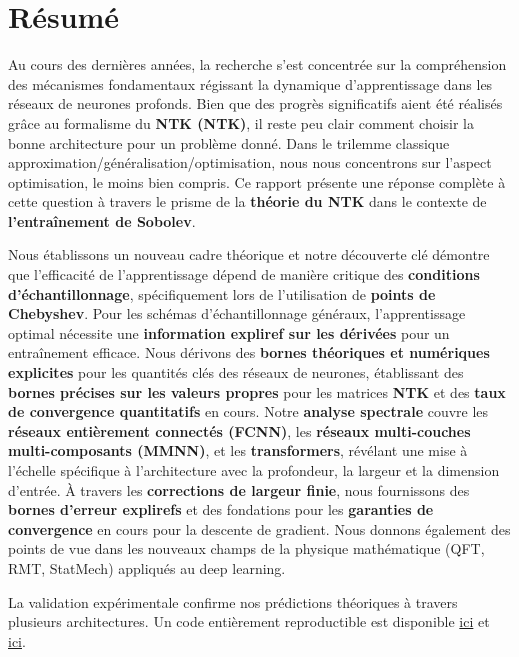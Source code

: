 \documentclass[a4paper]{article}
\theoremstyle{plain}
\theoremstyle{definition}
\theoremstyle{remark}
\begin{document}
\section*{Résumé}
Au cours des dernières années, la recherche s'est concentrée sur la compréhension des mécanismes fondamentaux régissant la dynamique d'apprentissage dans les réseaux de neurones profonds. Bien que des progrès significatifs aient été réalisés grâce au formalisme du \textbf{NTK (NTK)}, il reste peu clair comment choisir la bonne architecture pour un problème donné. Dans le trilemme classique approximation/généralisation/optimisation, nous nous concentrons sur l'aspect optimisation, le moins bien compris. Ce rapport présente une réponse complète à cette question à travers le prisme de la \textbf{théorie du NTK} dans le contexte de \textbf{l'entraînement de Sobolev}.

Nous établissons un nouveau cadre théorique et notre découverte clé démontre que l'efficacité de l'apprentissage dépend de manière critique des \textbf{conditions d'échantillonnage}, spécifiquement lors de l'utilisation de \textbf{points de Chebyshev}. Pour les schémas d'échantillonnage généraux, l'apprentissage optimal nécessite une \textbf{information expliref sur les dérivées} pour un entraînement efficace. Nous dérivons des \textbf{bornes théoriques et numériques explicites} pour les quantités clés des réseaux de neurones, établissant des \textbf{bornes précises sur les valeurs propres} pour les matrices \textbf{NTK} et des \textbf{taux de convergence quantitatifs} en cours. Notre \textbf{analyse spectrale} couvre les \textbf{réseaux entièrement connectés (FCNN)}, les \textbf{réseaux multi-couches multi-composants (MMNN)}, et les \textbf{transformers}, révélant une mise à l'échelle spécifique à l'architecture avec la profondeur, la largeur et la dimension d'entrée. À travers les \textbf{corrections de largeur finie}, nous fournissons des \textbf{bornes d'erreur explirefs} et des fondations pour les \textbf{garanties de convergence} en cours pour la descente de gradient.
Nous donnons également des points de vue dans les nouveaux champs de la physique mathématique (QFT, RMT, StatMech) appliqués au deep learning.

La validation expérimentale confirme nos prédictions théoriques à travers plusieurs architectures. Un code entièrement reproductible est disponible \href{https://github.com/janisaiad/DeNN-NTK}{ici} et \href{https://github.com/janisaiad/MMN}{ici}.
\newpage
\end{document}

